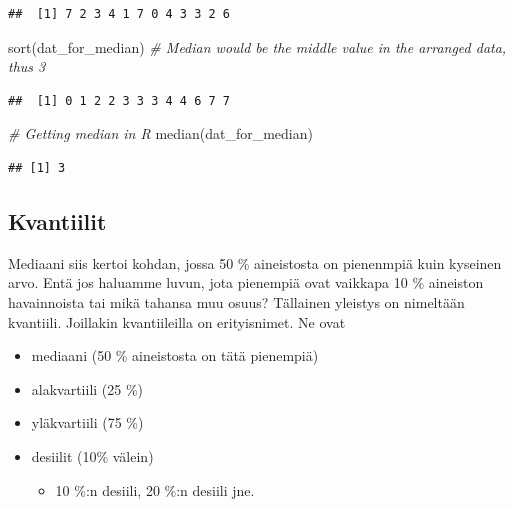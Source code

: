 \documentclass[
]{book}
\newenvironment{Shaded}{\begin{snugshade}}{\end{snugshade}}
\newcommand{\CommentTok}[1]{\textcolor[rgb]{0.56,0.35,0.01}{\textit{#1}}}
\newcommand{\FunctionTok}[1]{\textcolor[rgb]{0.00,0.00,0.00}{#1}}
\newcommand{\NormalTok}[1]{#1}
\providecommand{\tightlist}{%
  \setlength{\itemsep}{0pt}\setlength{\parskip}{0pt}}
\begin{document}
\begin{verbatim}
##  [1] 7 2 3 4 1 7 0 4 3 3 2 6
\end{verbatim}

\begin{Shaded}
\begin{Highlighting}[]
\FunctionTok{sort}\NormalTok{(dat\_for\_median) }\CommentTok{\# Median would be the middle value in the arranged data, thus 3}
\end{Highlighting}
\end{Shaded}

\begin{verbatim}
##  [1] 0 1 2 2 3 3 3 4 4 6 7 7
\end{verbatim}

\begin{Shaded}
\begin{Highlighting}[]
\CommentTok{\# Getting median in R}
\FunctionTok{median}\NormalTok{(dat\_for\_median)}
\end{Highlighting}
\end{Shaded}

\begin{verbatim}
## [1] 3
\end{verbatim}

\hypertarget{kvantiilit}{%
\subsection{Kvantiilit}\label{kvantiilit}}

Mediaani siis kertoi kohdan, jossa 50 \% aineistosta on pienenmpiä kuin kyseinen arvo. Entä jos haluamme luvun, jota pienempiä ovat vaikkapa 10 \% aineiston havainnoista tai mikä tahansa muu osuus? Tällainen yleistys on nimeltään kvantiili. Joillakin kvantiileilla on erityisnimet. Ne ovat

\begin{itemize}
\tightlist
\item
  mediaani (50 \% aineistosta on tätä pienempiä)
\item
  alakvartiili (25 \%)
\item
  yläkvartiili (75 \%)
\item
  desiilit (10\% välein)

  \begin{itemize}
  \tightlist
  \item
    10 \%:n desiili, 20 \%:n desiili jne.
  \end{itemize}
\end{itemize}
\end{document}
